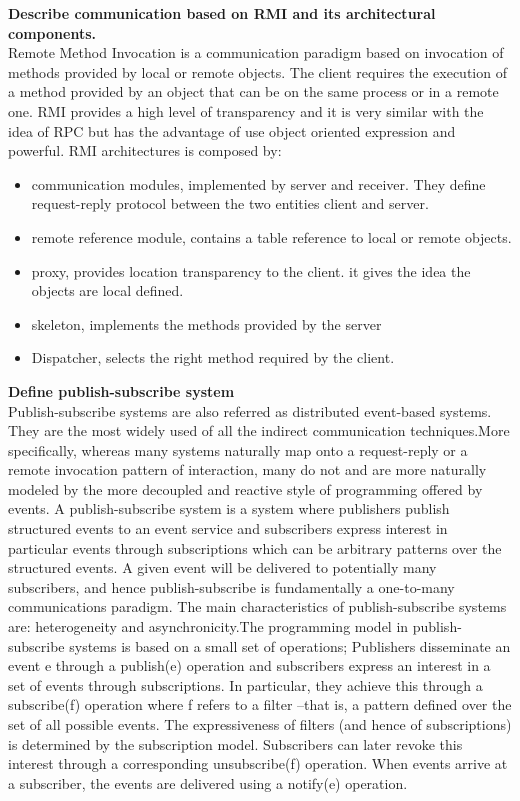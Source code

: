 \textbf{Describe communication based on RMI and its architectural components.}\\
Remote Method Invocation is a communication paradigm based on invocation of methods provided by local or remote objects. The client requires the execution of a method provided by an object that can be on the same process or in a remote one. RMI provides a high level of transparency and it is very similar with the idea of RPC but has the advantage of use object oriented expression and powerful. RMI architectures is composed by:
\begin{itemize}
	\item communication modules, implemented by server and receiver. They define request-reply protocol between the two entities client and server.
	\item remote reference module, contains a table reference to local or remote objects.
	\item proxy, provides location transparency to the client. it gives the idea the objects are local defined.
	\item skeleton, implements the methods provided by the server
	\item Dispatcher, selects the right method required by the client.
\end{itemize}


\textbf{Define publish-subscribe system}\\
Publish-subscribe systems are also referred as distributed event-based systems. They are the most widely used of all the indirect communication techniques.More specifically, whereas many systems naturally map onto a request-reply or a remote invocation pattern of interaction, many do not and are more naturally modeled by the more decoupled and reactive style of programming offered by events. A publish-subscribe system is a system where publishers publish structured events to an event service and subscribers express interest in particular events through subscriptions which can be arbitrary patterns over the structured events. A given event will be delivered to potentially many subscribers, and hence publish-subscribe is fundamentally a one-to-many communications paradigm. The main characteristics of publish-subscribe systems are: heterogeneity and asynchronicity.The programming model in publish-subscribe systems is based on a small set of operations; Publishers disseminate an event e through a publish(e) operation and subscribers express an interest in a set of events through subscriptions. In particular, they achieve this through a subscribe(f) operation where f refers to a filter –that is, a pattern defined over the set of all possible events. The expressiveness of filters (and hence of subscriptions) is determined by the subscription model. Subscribers can later revoke this interest through a corresponding unsubscribe(f) operation. When events arrive at a subscriber, the events are delivered using a notify(e) operation. 